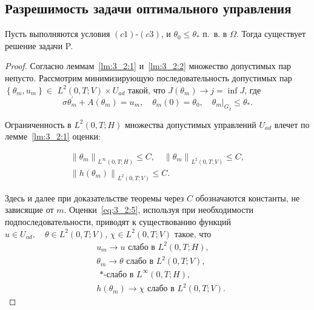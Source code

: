 \subsection{Разрешимость задачи оптимального управления}
\label{subsec:ch3:sec2:subsec5}

\begin{theorem}
    \label{th:3_2:1}
    Пусть выполняются условия $(c1)$-$(c3)$, и $\theta_{0} \leq \theta_{*}$ п.\ в. в $\Omega$.
    Тогда существует решение задачи P\@.
\end{theorem}

\begin{proof}
    Согласно леммам~\ref{lm:3_2:1} и~\ref{lm:3_2:2} множество допустимых пар непусто.
    Рассмотрим минимизирующую последовательность допустимых
    пар $\left\{\theta_{m}, u_{m}\right\} \in$ $L^{2}(0, T ; V) \times U_{a d}$
    такой, что $J\left(\theta_{m}\right) \rightarrow j=\inf J$, где
    \begin{equation}
        \label{eq:3_2:4}
        \sigma \theta_{m}^{\prime}+A\left(\theta_{m}\right)=u_{m},
        \quad \theta_{m}(0)=\theta_{0},\left.\quad \theta_{m}\right|_{G_{2}} \leq \theta_{*}.
    \end{equation}

    Ограниченность в $L^{2}(0, T; H)$ множества допустимых
    управлений $U_{a d}$ влечет по лемме~\ref{lm:3_2:1} оценки:

    \begin{equation}
        \label{eq:3_2:5}
        \begin{gathered}
            \left\|\theta_{m}\right\|_{L^{\infty}(0, T ; H)} \leq C,
            \quad\left\|\theta_{m}\right\|_{L^{2}(0, T ; V)} \leq C, \\
            \left\|h\left(\theta_{m}\right)\right\|_{L^{2}(0, T ; V)} \leq C.
        \end{gathered}
    \end{equation}

    Здесь и далее при доказательстве теоремы через $C$
    обозначаются константы, не зависящие от $m$.
    Оценки~\eqref{eq:3_2:5}, используя при необходимости подпоследовательности,
    приводят к существованию функций
    $u \in U_{a d}, \quad \theta \in L^{2}(0, T; V)$, $\chi  \in L^{2}(0, T; V)$
    такое, что
    \begin{equation}
        \label{eq:3_2:6}
        \begin{aligned}
            & u_{m} \rightarrow u \text { слабо в } L^{2}(0, T ; H), \\
            & \theta_{m} \rightarrow \theta \text { слабо в }
            L^{2}(0, T ; V) \text {, } \\
            & \text { *-слабо в } L^{\infty}(0, T ; H), \\
            & h\left(\theta_{m}\right) \rightarrow \chi
            \text { слабо в } L^{2}(0, T; V).
        \end{aligned}
    \end{equation}


\end{proof}

